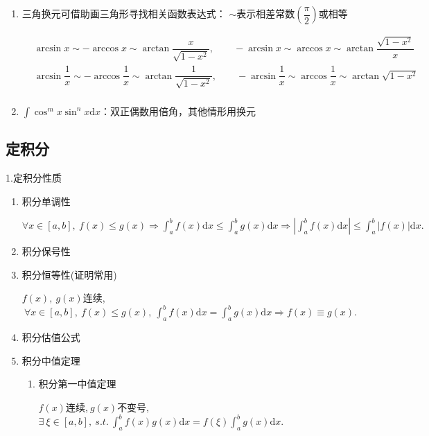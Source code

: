 \documentclass[UTF8]{ctexart}
\numberwithin{equation}{section}
\numberwithin{figure}{section}
\numberwithin{table}{section}
\newcommand\dif{\mathrm{d}}
\newcommand\no{\noindent}
\newcommand\dis{\displaystyle}
\newcommand\ls{\leqslant}
\newcommand\intd{\dis\int}
\newcommand\intab{\dis\int_a^b}
\begin{document}
\begin{spacing}{2}
\begin{enumerate}[itemindent=1.4em, label=(\arabic*)]
\item 三角换元可借助画三角形寻找相关函数表达式：
$\sim$表示相差常数$\left(\dfrac{\pi}{2}\right)$或相等

$\begin{aligned}
&\arcsin x\sim-\arccos x\sim\arctan\dfrac{x}{\sqrt{1-x^2}},\qquad
-\arcsin x\sim\arccos x\sim\arctan\dfrac{\sqrt{1-x^2}}{x}\\
&\arcsin \dfrac{1}{x}\sim-\arccos \dfrac{1}{x}\sim\arctan\dfrac{1}{\sqrt{1-x^2}},\qquad
-\arcsin \dfrac{1}{x}\sim\arccos \dfrac{1}{x}\sim\arctan\sqrt{1-x^2}\\
\end{aligned}$

\item $\intd\cos^mx\sin^nx\dif x$：双正偶数用倍角，其他情形用换元

\end{enumerate}

\subsection{定积分}

\no1.定积分性质

\begin{enumerate}[itemindent=1.4em, label=(\arabic*)]

\item 积分单调性

$\forall x\in[a,b],\ f(x)\ls g(x)\Longrightarrow\intab f(x)\dif x\ls\intab g(x)\dif x\Longrightarrow\left|\intab f(x)\dif x\right|\ls\intab|f(x)|\dif x.$

\item 积分保号性

\item 积分恒等性(证明常用)

$f(x),\ g(x)$连续,$\ \forall x\in[a,b],\ f(x)\ls g(x),\ \intab f(x)\dif x=\intab g(x)\dif  x
\Longrightarrow f(x)\equiv g(x).$

\item 积分估值公式

\item 积分中值定理

\begin{enumerate}[itemindent=1.4em, label=(\alph*)]

\item 积分第一中值定理

$f(x)$连续,$\ g(x)$不变号, $\exists\ \xi\in[a,b],\ s.t.\ \intab f(x)g(x)\dif x
=f(\xi)\intab g(x)\dif x.$


\end{enumerate}
\end{enumerate}
\end{spacing}
\end{document}

